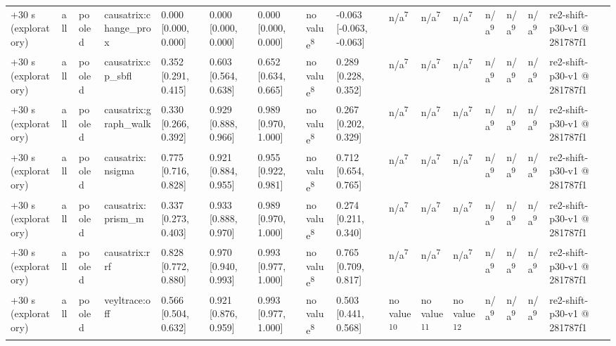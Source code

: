 \begin{table}[t]
\begin{tabular}{llllllllllllllll}
+30 s (exploratory) & all & pooled & causatrix:change\_prox & 0.000 [0.000, 0.000] & 0.000 [0.000, 0.000] & 0.000 [0.000, 0.000] & no value\textsuperscript{8} & -0.063 [-0.063, -0.063] & n/a\textsuperscript{7} & n/a\textsuperscript{7} & n/a\textsuperscript{7} & n/a\textsuperscript{9} & n/a\textsuperscript{9} & n/a\textsuperscript{9} & re2-shift-p30-v1 @ 281787f1 \\
+30 s (exploratory) & all & pooled & causatrix:cp\_sbfl & 0.352 [0.291, 0.415] & 0.603 [0.564, 0.638] & 0.652 [0.634, 0.665] & no value\textsuperscript{8} & 0.289 [0.228, 0.352] & n/a\textsuperscript{7} & n/a\textsuperscript{7} & n/a\textsuperscript{7} & n/a\textsuperscript{9} & n/a\textsuperscript{9} & n/a\textsuperscript{9} & re2-shift-p30-v1 @ 281787f1 \\
+30 s (exploratory) & all & pooled & causatrix:graph\_walk & 0.330 [0.266, 0.392] & 0.929 [0.888, 0.966] & 0.989 [0.970, 1.000] & no value\textsuperscript{8} & 0.267 [0.202, 0.329] & n/a\textsuperscript{7} & n/a\textsuperscript{7} & n/a\textsuperscript{7} & n/a\textsuperscript{9} & n/a\textsuperscript{9} & n/a\textsuperscript{9} & re2-shift-p30-v1 @ 281787f1 \\
+30 s (exploratory) & all & pooled & causatrix:nsigma & 0.775 [0.716, 0.828] & 0.921 [0.884, 0.955] & 0.955 [0.922, 0.981] & no value\textsuperscript{8} & 0.712 [0.654, 0.765] & n/a\textsuperscript{7} & n/a\textsuperscript{7} & n/a\textsuperscript{7} & n/a\textsuperscript{9} & n/a\textsuperscript{9} & n/a\textsuperscript{9} & re2-shift-p30-v1 @ 281787f1 \\
+30 s (exploratory) & all & pooled & causatrix:prism\_m & 0.337 [0.273, 0.403] & 0.933 [0.888, 0.970] & 0.989 [0.970, 1.000] & no value\textsuperscript{8} & 0.274 [0.211, 0.340] & n/a\textsuperscript{7} & n/a\textsuperscript{7} & n/a\textsuperscript{7} & n/a\textsuperscript{9} & n/a\textsuperscript{9} & n/a\textsuperscript{9} & re2-shift-p30-v1 @ 281787f1 \\
+30 s (exploratory) & all & pooled & causatrix:rrf & 0.828 [0.772, 0.880] & 0.970 [0.940, 0.993] & 0.993 [0.977, 1.000] & no value\textsuperscript{8} & 0.765 [0.709, 0.817] & n/a\textsuperscript{7} & n/a\textsuperscript{7} & n/a\textsuperscript{7} & n/a\textsuperscript{9} & n/a\textsuperscript{9} & n/a\textsuperscript{9} & re2-shift-p30-v1 @ 281787f1 \\
+30 s (exploratory) & all & pooled & veyltrace:off & 0.566 [0.504, 0.632] & 0.921 [0.876, 0.959] & 0.993 [0.977, 1.000] & no value\textsuperscript{8} & 0.503 [0.441, 0.568] & no value\textsuperscript{10} & no value\textsuperscript{11} & no value\textsuperscript{12} & n/a\textsuperscript{9} & n/a\textsuperscript{9} & n/a\textsuperscript{9} & re2-shift-p30-v1 @ 281787f1 \\

\end{tabular}
\end{table}
